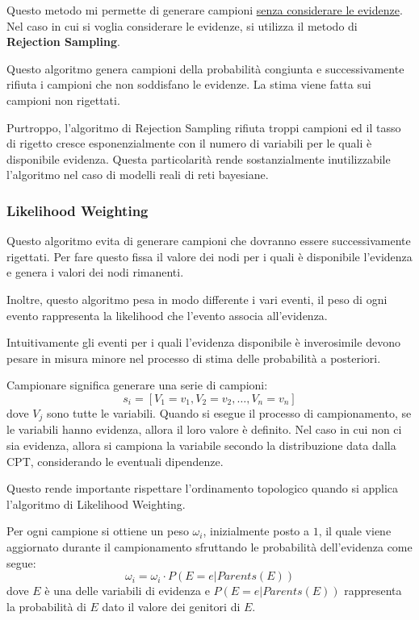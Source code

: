 Questo metodo mi permette di generare campioni \underline{senza considerare le
    evidenze}. Nel caso in cui si voglia considerare le evidenze, si utilizza il
metodo di \textbf{Rejection Sampling}.

Questo algoritmo genera campioni della probabilità congiunta e successivamente
rifiuta i campioni che non soddisfano le evidenze. La stima viene fatta sui
campioni non rigettati.

Purtroppo, l'algoritmo di Rejection Sampling rifiuta troppi campioni ed il tasso
di rigetto cresce esponenzialmente con il numero di variabili per le quali è
disponibile evidenza. Questa particolarità rende sostanzialmente inutilizzabile
l'algoritmo nel caso di modelli reali di reti bayesiane.
\subsubsection{Likelihood Weighting}
Questo algoritmo evita di generare campioni che dovranno essere successivamente
rigettati. Per fare questo fissa il valore dei nodi per i quali è disponibile
l'evidenza e genera i valori dei nodi rimanenti.

Inoltre, questo algoritmo pesa in modo differente i vari eventi, il peso di ogni
evento rappresenta la likelihood che l'evento associa all'evidenza.

Intuitivamente gli eventi per i quali l'evidenza disponibile è inverosimile devono
pesare in misura minore nel processo di stima delle probabilità a posteriori.

Campionare significa generare una serie di campioni:
\begin{equation*}
    s_i = \left[V_1=v_1, V_2= v_2, \dots, V_n=v_n\right]
\end{equation*}
dove $V_j$ sono tutte le variabili. Quando si esegue il processo di campionamento,
se le variabili hanno evidenza, allora il loro valore è definito. Nel caso in
cui non ci sia evidenza, allora si campiona la variabile secondo la distribuzione
data dalla CPT, considerando le eventuali dipendenze.

Questo rende importante rispettare l'ordinamento topologico quando si applica
l'algoritmo di Likelihood Weighting.

Per ogni campione si ottiene un peso $\omega_i$, inizialmente posto a $1$, il
quale viene aggiornato durante il campionamento sfruttando le probabilità
dell'evidenza come segue:
\begin{equation*}
    \omega_i = \omega_i \cdot P(E = e | Parents(E))
\end{equation*}
dove $E$ è una delle variabili di evidenza e $P(E=e | Parents(E))$ rappresenta la
probabilità di $E$ dato il valore dei genitori di $E$.

